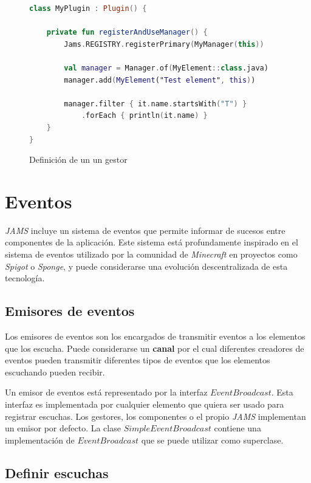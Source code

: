 \begin{figure}[h]
    \centering
    \begin{lstlisting}[frame=single,label={lst:manager-use},language=Kotlin]
class MyPlugin : Plugin() {

    private fun registerAndUseManager() {
        Jams.REGISTRY.registerPrimary(MyManager(this))

        val manager = Manager.of(MyElement::class.java)
        manager.add(MyElement("Test element", this))

        manager.filter { it.name.startsWith("T") }
            .forEach { println(it.name) }
    }
}
    \end{lstlisting}
    \caption{Definición de un un gestor}
    \label{fig:manager-use}
\end{figure}


\section{Eventos}\label{sec:eventos}

\textit{JAMS} incluye un sistema de eventos que permite informar
de sucesos entre componentes de la aplicación.
Este sistema está profundamente inspirado en el sistema de eventos
utilizado por la comunidad de \textit{Minecraft}
en proyectos como \textit{Spigot}\cite{SPIGOT}
o \textit{Sponge}\cite{SPONGE}, y puede considerarse una evolución descentralizada
de esta tecnología.

\subsection{Emisores de eventos}\label{subsec:emisores-de-eventos}

Los emisores de eventos son los encargados de transmitir
eventos a los elementos que los escucha.
Puede considerarse un \textbf{canal} por el cual diferentes creadores
de eventos pueden transmitir diferentes tipos de eventos
que los elementos escuchando pueden recibir.

 Un emisor de eventos está representado por la interfaz $EventBroadcast$.
Esta interfaz es implementada por cualquier elemento que quiera ser
usado para registrar escuchas.
Los gestores, los componentes o el propio \textit{JAMS} implementan
un emisor por defecto.
La clase $SimpleEventBroadcast$ contiene una implementación de $EventBroadcast$
que se puede utilizar como superclase.

\subsection{Definir escuchas}\label{subsec:definir-escuchas}

